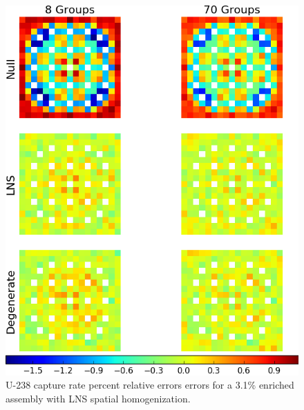 \begin{figure}[h!]
\centering
\includegraphics[width=\linewidth]{figures/patterns/lns/assm-31/capt-err}
\vspace{2mm}
\caption[U-238 capture rate errors for a 3.1\% enriched assembly]{U-238 capture rate percent relative errors errors for a 3.1\% enriched assembly with \ac{LNS} spatial homogenization.}
\label{fig:chap9-assm-3.1-lns-capt-err}
\end{figure}

\clearpage

